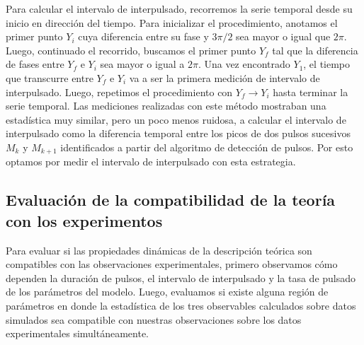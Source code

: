 \documentclass[./main.tex]{subfiles}
\begin{document}
Para calcular el intervalo de interpulsado, recorremos la serie temporal desde su inicio en dirección del tiempo. Para inicializar el procedimiento, anotamos el primer punto $Y_i$ cuya diferencia entre su fase y $3\pi/2$ sea mayor o igual que $2\pi$. Luego, continuado el recorrido, buscamos el primer punto $Y_f$ tal que la diferencia de fases entre $Y_f$ e $Y_i$ sea mayor o igual a $2\pi$. Una vez encontrado $Y_1$, el tiempo que transcurre entre $Y_f$ e $Y_i$ va a ser la primera medición de intervalo de interpulsado. Luego, repetimos el procedimiento  con $Y_f \rightarrow Y_i$ hasta terminar la serie temporal. Las mediciones realizadas con este método mostraban una estadística muy similar, pero un poco menos ruidosa, a calcular el intervalo de interpulsado como la diferencia temporal entre los picos de dos pulsos sucesivos $M_k$ y $M_{k+1}$ identificados a partir del algoritmo de detección de pulsos. Por esto optamos por medir el intervalo de interpulsado con esta estrategia. 


\subsection{Evaluación de la compatibilidad de la teoría con los experimentos}

Para evaluar si las propiedades dinámicas de la descripción teórica son compatibles con las observaciones experimentales, primero observamos cómo dependen la duración de pulsos, el intervalo de interpulsado y la tasa de pulsado de los parámetros del modelo. Luego, evaluamos si existe alguna región de parámetros en donde la estadística de los tres observables calculados sobre datos simulados sea compatible con nuestras observaciones sobre los datos experimentales simultáneamente. 
\end{document}
